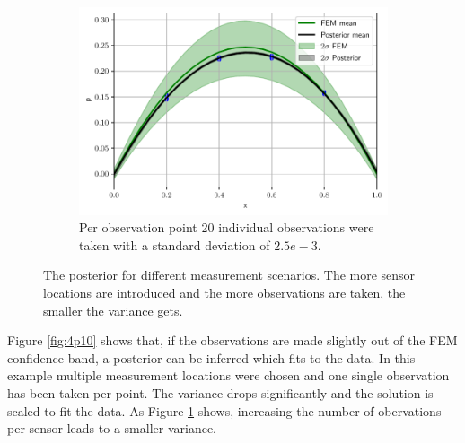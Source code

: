 \documentclass[%
  a4paper,oneside,%
  11pt,%
  smallchapters,
  style=printdev,
  extramargin,
  green,%
  rgb, <cmyk>
  ]{tubsbook}
\begin{document}
\begin{figure}[!ht]
	\begin{subfigure}[t]{.5\textwidth}
	\centering
	\includegraphics[width=1\linewidth]{pics/1DPost_4P20O.pdf}
	\caption{Per observation point 20 individual observations were taken with a standard deviation of $2.5e-3$. }	
	\label{fig:DataCloseToCI2}
	\end{subfigure}%

\caption{The posterior for different measurement scenarios. The more sensor locations are introduced and the more observations are taken, the smaller the variance gets.}	
	
\label{fig:OneSensor}
\end{figure}
%
Figure \ref{fig:4p10} shows that, if the observations are made slightly out of the FEM confidence band, a posterior can be inferred which fits to the data. In this example multiple measurement locations were chosen and one single observation has been taken per point. The variance drops significantly and the solution is scaled to fit the data.
%
As Figure \ref{fig:DataCloseToCI2} shows, increasing the number of obervations per sensor leads to a smaller variance.
\end{document}
